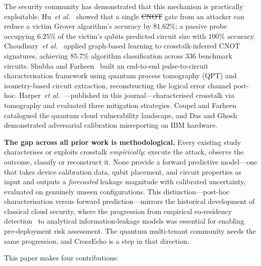 \documentclass[ASNA,twocolumn]{USG}
\providecommand{\DIFaddtex}[1]{{\protect\color{blue}\uwave{#1}}} %
\providecommand{\DIFdeltex}[1]{{\protect\color{red}\sout{#1}}}                      %
\providecommand{\DIFaddbegin}{} %
\providecommand{\DIFaddend}{} %
\providecommand{\DIFdelbegin}{} %
\providecommand{\DIFdelend}{} %
\providecommand{\DIFadd}[1]{\texorpdfstring{\DIFaddtex{#1}}{#1}} %
\providecommand{\DIFdel}[1]{\texorpdfstring{\DIFdeltex{#1}}{}} %
\begin{document}
The security community has demonstrated that this mechanism is practically exploitable. Hu~\emph{et al.}~\cite{hu2025swap} showed that a single \DIFdelbegin \DIFdel{CNOT }\DIFdelend \DIFaddbegin \DIFadd{controlled-NOT (CNOT) }\DIFaddend gate from an attacker can reduce a victim Grover algorithm's accuracy by $81.62\%$; a passive probe occupying $6.25\%$ of the victim's qubits predicted circuit size with $100\%$ accuracy. Choudhury~\emph{et al.}~\cite{choudhury2024crosstalk} applied graph-based learning to crosstalk-inferred CNOT signatures, achieving $85.7\%$ algorithm classification across $336$ benchmark circuits. Shubha and Farheen~\cite{shubha2025pulse} built an end-to-end pulse-to-circuit characterisation framework using quantum process tomography (QPT) and isometry-based circuit extraction, reconstructing the logical error channel post-hoc. Harper~\emph{et al.}~\cite{harper2025crosstalk}---published in this journal---characterised crosstalk via tomography and evaluated three mitigation strategies. Coupel and Farheen~\cite{coupel2025survey} catalogued the quantum cloud vulnerability landscape, and Das and Ghosh~\cite{das2025calibration} demonstrated adversarial calibration misreporting on IBM hardware.

\textbf{The gap across all prior work is methodological.} Every existing study characterises or exploits crosstalk \emph{empirically}: execute the attack, observe the outcome, classify or reconstruct it. None provide a forward predictive model---one that takes device calibration data, qubit placement, and circuit properties as input and outputs a \emph{forecasted} leakage magnitude with calibrated uncertainty, evaluated on genuinely unseen configurations. This distinction---post-hoc characterisation versus forward prediction---mirrors the historical development of classical cloud security, where the progression from empirical co-residency detection~\cite{ristenpart2009hey} to analytical information-leakage models was essential for enabling pre-deployment risk assessment. The quantum multi-tenant community needs the same progression, and CrossEcho is a step in that direction.

This paper makes four contributions:
\end{document}
